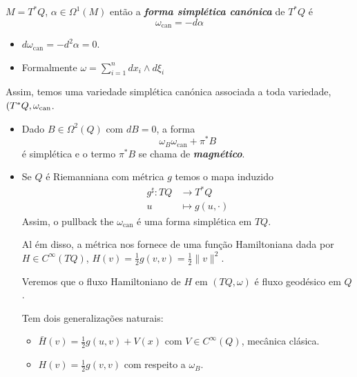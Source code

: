 \begin{defn}
	$M=T^*Q$, $\alpha\in\Omega^{1}(M)$ ent\~ao a \textit{\textbf{forma simpl\'etica can\'onica}} de $T^*Q$ \'e
	\[\omega_{\operatorname{can}}=-d\alpha\]
\end{defn}

\begin{remark}\leavevmode
	\begin{itemize}
		\item $d\omega_{\operatorname{can}}=-d^{2}\alpha=0$.
		\item Formalmente $\omega=\sum_{i=1}^{n}dx_i\wedge d\xi_i$
	\end{itemize}
\end{remark}

Assim, temos uma variedade simpl\'etica can\'onica associada a toda variedade, $\\(T^* Q,\omega_{\operatorname{can}}$.

\begin{remark}\leavevmode 
	\begin{itemize}
		\item Dado $B\in\Omega^{2}(Q)$ com $dB=0$, a forma
			 \[\omega_{B}\omega_{\operatorname{can}}+\pi^*B\]
			 \'e simpl\'etica e o termo $\pi^*B$ se chama de \textit{\textbf{magn\'etico}}.

			\item Se $Q$ \'e Riemanniana com m\'etrica $g$ temos o mapa induzido
				\begin{align*}
					g^{\sharp}: TQ &\longrightarrow T^*Q \\
					u &\longmapsto g(u,\cdot )
				\end{align*}
				Assim, o pullback the $\omega_{\operatorname{can}}$ \'e uma forma simpl\'etica em $TQ$.

	Al \'em disso, a m\'etrica nos fornece de uma fun\c c\~ao Hamiltoniana dada por $H\in C^{\infty}(TQ)$, $H(v)=\frac{1}{2}g(v,v)=\frac{1}{2}\|v\|^{2}$.

	Veremos que o fluxo Hamiltoniano de $H$ em $(TQ,\omega)$ \'e fluxo geod\'esico em $Q$.

	Tem dois generaliza\c c\~oes naturais:
	\begin{itemize}
		\item  $\bar{H}(v)=\frac{1}{2}g(u,v)+V(x)$ com $V\in C^{\infty}(Q)$, mec\^anica cl\'asica.

		\item $H(v)=\frac{1}{2}g(v,v)$ com respeito a $\omega_{B}$.
	\end{itemize}
	\end{itemize}
\end{remark}

